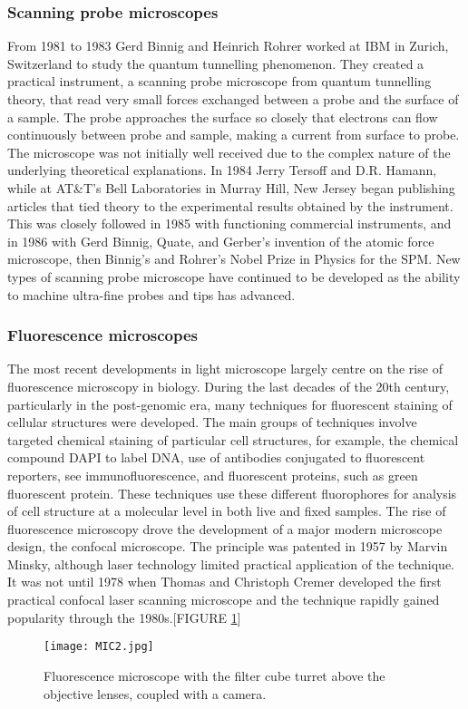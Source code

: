 \documentclass[12pt]{article}
\begin{document}
\subsubsection{Scanning probe microscopes}
From 1981 to 1983 Gerd Binnig and Heinrich Rohrer worked at IBM in Zurich, Switzerland to study the quantum tunnelling phenomenon.
They created a practical instrument, a scanning probe microscope from quantum tunnelling theory, that read very small forces exchanged between a probe and the surface of a sample.
The probe approaches the surface so closely that electrons can flow continuously between probe and sample, making a current from surface to probe.
The microscope was not initially well received due to the complex nature of the underlying theoretical explanations.
In 1984 Jerry Tersoff and D.R. Hamann, while at AT\&T's Bell Laboratories in Murray Hill, New Jersey began publishing articles that tied theory to the experimental results obtained by the instrument.
This was closely followed in 1985 with functioning commercial instruments, and in 1986 with Gerd Binnig, Quate, and Gerber's invention of the atomic force microscope, then Binnig's and Rohrer's Nobel Prize in Physics for the SPM. New types of scanning probe microscope have continued to be developed as the ability to machine ultra-fine probes and tips has advanced.

\subsubsection{Fluorescence microscopes}
The most recent developments in light microscope largely centre on the rise of fluorescence microscopy in biology.
During the last decades of the 20th century, particularly in the post-genomic era, many techniques for fluorescent staining of cellular structures were developed.
The main groups of techniques involve targeted chemical staining of particular cell structures, for example, the chemical compound DAPI to label DNA, use of antibodies conjugated to fluorescent reporters, see immunofluorescence, and fluorescent proteins, such as green fluorescent protein.
These techniques use these different fluorophores for analysis of cell structure at a molecular level in both live and fixed samples.
The rise of fluorescence microscopy drove the development of a major modern microscope design, the confocal microscope.
The principle was patented in 1957 by Marvin Minsky, although laser technology limited practical application of the technique.
It was not until 1978 when Thomas and Christoph Cremer developed the first practical confocal laser scanning microscope and the technique rapidly gained popularity through the 1980s.[FIGURE \ref{fig_MIC2}]
\begin{figure}[h]
\centering
\texttt{[image: MIC2.jpg]}
\caption{Fluorescence microscope with the filter cube turret above the objective lenses, coupled with a camera.}
\label{fig_MIC2}
\end{figure}
\end{document}

